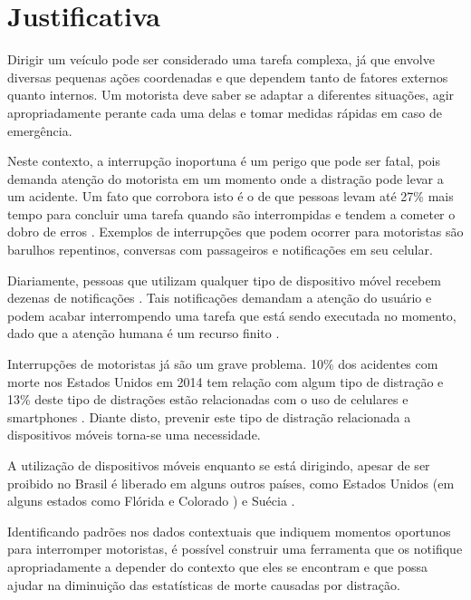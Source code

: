 \chapter{Justificativa}

Dirigir um veículo pode ser considerado uma tarefa complexa, já que envolve diversas pequenas ações coordenadas e
que dependem tanto de fatores externos quanto internos. Um motorista deve saber se adaptar a diferentes situações,
agir apropriadamente perante cada uma delas e tomar medidas rápidas em caso de emergência.

Neste contexto, a interrupção inoportuna é um perigo que pode ser fatal, pois demanda atenção do motorista em um momento
onde a distração pode levar a um acidente. Um fato que corrobora isto é o de que pessoas levam até 27\% mais tempo para
concluir uma tarefa quando são interrompidas e tendem a cometer o dobro de erros \cite{bailey2006need}. Exemplos de interrupções que podem
ocorrer para motoristas são barulhos repentinos, conversas com passageiros e notificações em seu celular.

Diariamente, pessoas que utilizam qualquer tipo de dispositivo móvel recebem dezenas de notificações \cite{pielot2014situ}. Tais notificações
demandam a atenção do usuário e podem acabar interrompendo uma tarefa que está sendo executada no momento, dado que a
atenção humana é um recurso finito \cite{simon1971designing}.

Interrupções de motoristas já são um grave problema. 10\% dos acidentes com morte nos Estados Unidos em 2014 tem relação
com algum tipo de distração e 13\% deste tipo de distrações estão relacionadas com o uso de celulares e smartphones \cite{distracted2014}.
Diante disto, prevenir este tipo de distração relacionada a dispositivos móveis torna-se uma necessidade.

A utilização de dispositivos móveis enquanto se está dirigindo, apesar de ser proibido no Brasil é liberado em alguns
outros países, como Estados Unidos (em alguns estados como Flórida e Colorado \cite{cellphoneuse}\cite{distracteddriving}) e Suécia \cite{swedendrive}.

Identificando padrões nos dados contextuais que indiquem momentos oportunos para interromper motoristas, é possível
construir uma ferramenta que os notifique apropriadamente a depender do contexto que eles se encontram e que possa ajudar
na diminuição das estatísticas de morte causadas por distração.

